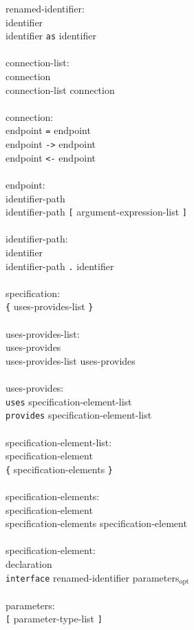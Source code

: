 \documentclass[11pt]{article}
\newcommand{\kw}[1]{{\tt #1}}
\newcommand{\opt}{$_{\mbox{opt}}$\xspace}
\begin{document}
\begin{tabbing}
renamed-identifier:\\
\>	identifier\\
\>	identifier \kw{as} identifier\\
\\
connection-list:\\
\>	connection\\
\>	connection-list connection\\
\\
connection:\\
\>	endpoint \kw{=} endpoint\\
\>	endpoint \kw{->} endpoint\\
\>	endpoint \kw{<-} endpoint\\
\\
endpoint:\\
\>	identifier-path \\
\>	identifier-path \kw{[} argument-expression-list \kw{]}\\
\\
identifier-path:\\
\>	identifier\\
\>	identifier-path \kw{.} identifier\\
\\
specification:\\
\>	\kw{\{} uses-provides-list \kw{\}}\\
\\
uses-provides-list:\\
\>	uses-provides\\
\>	uses-provides-list uses-provides\\
\\
uses-provides:\\
\>	\kw{uses} specification-element-list\\
\>	\kw{provides} specification-element-list\\
\\
specification-element-list:\\
\>	specification-element\\
\>	\kw{\{} specification-elements \kw{\}}\\
\\
specification-elements:\\
\>	specification-element\\
\>	specification-elements specification-element\\
\\
specification-element:\\
\>	declaration\\
\>	\kw{interface} renamed-identifier parameters\opt\\
\\
parameters:\\
\>	\kw{[} parameter-type-list \kw{]}
\end{tabbing} \rm
\end{document}
